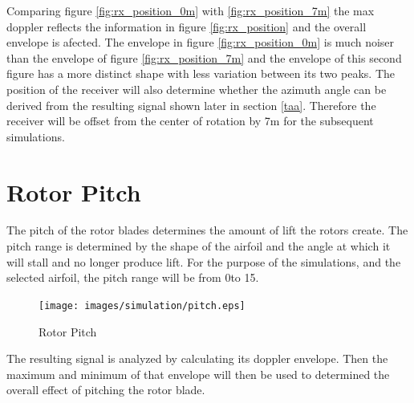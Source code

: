 Comparing figure \ref{fig:rx_position_0m} with \ref{fig:rx_position_7m} the max doppler reflects the information in figure \ref{fig:rx_position} and the overall envelope is afected. The envelope in figure \ref{fig:rx_position_0m} is much noiser than the envelope of figure \ref{fig:rx_position_7m} and the envelope of this second figure has a more distinct shape with less variation between its two peaks. The position of the receiver will also determine whether the azimuth angle can be derived from the resulting signal shown later in section \ref{taa}. Therefore the receiver will be offset from the center of rotation by 7m for the subsequent simulations.


\section{Rotor Pitch}
The pitch of the rotor blades determines the amount of lift the rotors create. The pitch range is determined by the shape of the airfoil and the angle at which it will stall and no longer produce lift. For the purpose of the simulations, and the selected airfoil, the pitch range will be from 0\textdegree  \space to 15\textdegree.

\begin{figure}
	\begin{center}
		\texttt{[image: images/simulation/pitch.eps]}
		\caption{Rotor Pitch}
		\label{fig:blade_pitch}
	\end{center}
\end{figure}

The resulting signal is analyzed by calculating its doppler envelope. Then the maximum and minimum of that envelope will then be used to determined the overall effect of pitching the rotor blade. 

